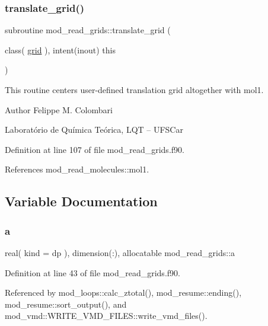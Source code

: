 \subsubsection{\texorpdfstring{translate\+\_\+grid()}{translate\_grid()}}
{\footnotesize\ttfamily subroutine mod\+\_\+read\+\_\+grids\+::translate\+\_\+grid (\begin{DoxyParamCaption}\item[{class( \hyperlink{structmod__read__grids_1_1grid}{grid} ), intent(inout)}]{this }\end{DoxyParamCaption})}



This routine centers user-\/defined translation grid altogether with mol1. 

\begin{DoxyAuthor}{Author}
Felippe M. Colombari
\begin{DoxyItemize}
\item Laboratório de Química Teórica, L\+QT -- U\+F\+S\+Car 
\end{DoxyItemize}
\end{DoxyAuthor}


Definition at line 107 of file mod\+\_\+read\+\_\+grids.\+f90.



References mod\+\_\+read\+\_\+molecules\+::mol1.



\subsection{Variable Documentation}
\mbox{\label{namespacemod__read__grids_a1cd0dd1119fe3ce58917bf6aaf7abebf}} 
\subsubsection{\texorpdfstring{a}{a}}
{\footnotesize\ttfamily real( kind = dp ), dimension(\+:), allocatable mod\+\_\+read\+\_\+grids\+::a}



Definition at line 43 of file mod\+\_\+read\+\_\+grids.\+f90.



Referenced by mod\+\_\+loops\+::calc\+\_\+ztotal(), mod\+\_\+resume\+::ending(), mod\+\_\+resume\+::sort\+\_\+output(), and mod\+\_\+vmd\+::\+W\+R\+I\+T\+E\+\_\+\+V\+M\+D\+\_\+\+F\+I\+L\+E\+S\+::write\+\_\+vmd\+\_\+files().

